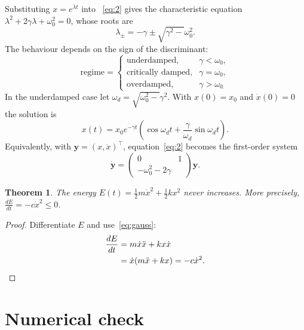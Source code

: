 \documentclass[11pt,a4paper]{article}
\newtheorem{theorem}{Theorem}
\begin{document}
Substituting $x=e^{\lambda t}$ into ~\eqref{eq:2} gives the characteristic equation $\lambda^{2}+2\gamma\lambda+\omega_{0}^{2}=0$, whose roots are
\begin{equation}
  \lambda_{\pm}=-\gamma\pm\sqrt{\gamma^{2}-}\omega_{0}^{2}.
\end{equation}
The behaviour depends on the sign of the discriminant:
\begin{equation*}
  \text{regime}=\begin{cases}
\text{underdamped}, & \gamma<\omega_{0}, \\
\text{critically damped}, & \gamma=\omega_{0}, \\
\text{overdamped}, & \gamma>\omega_{0.}
\end{cases}
\end{equation*}
In the underdamped case let $\omega_{d}=\sqrt{\omega_{0}^{2}-}\gamma^{2}$. With $x(0)=x_{0}$ and $\dot{x}(0)=0$ the solution is
\begin{equation}
  x(t)=x_{0}e^{-\gamma t}\left( \cos\omega_{d}t+\frac{\gamma}{\omega_{d}}\sin\omega_{d}t \right).
  \label{eq:cos-dsin}
\end{equation}
Equivalently, with $\mathbf{y}=(x,\dot{x})^{\top}$, equation~\eqref{eq:2} becomes the first-order system
\begin{equation}
  \dot{\mathbf{y}}=\begin{pmatrix}
0 & 1 \\
-\omega_{0}^{2}-2\gamma & 
\end{pmatrix}\mathbf{y}.
\end{equation}

\begin{theorem}
  The energy $E(t)=\frac{1}{2}m\dot{x}^{2}+\frac{1}{2}kx^{2}$ never increases. More precisely, $\frac{dE}{dt}=-c\dot{x}^{2}\leq0$.
\end{theorem}

\begin{proof}
  Differentiate $E$ and use~\eqref{eq:gauss}:
\begin{align*}
  \frac{dE}{dt} &=m\dot{x}\ddot{x}+kx\dot{x} \\
   &=\dot{x}(m\ddot{x}+kx)=-c\dot{x}^{2}. \qedhere
\end{align*}
\end{proof}

\section{Numerical check}
\end{document}
